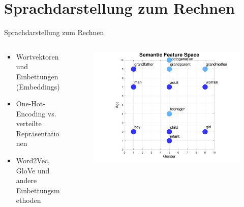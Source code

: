 \documentclass[aspectratio=1610, xcolor=dvipsnames, 9pt]{beamer}
\begin{document}
\section{Sprachdarstellung zum Rechnen}
\begin{frame}{Sprachdarstellung zum Rechnen}
  \begin{columns}
    \begin{column}{0.5\textwidth}
      \begin{itemize}
        \item Wortvektoren und Einbettungen (Embeddings) \\ 
        \item One-Hot-Encoding vs. verteilte Repräsentationen \\ 
        \item Word2Vec, GloVe und andere Einbettungsmethoden
      \end{itemize}
    \end{column}
    \begin{column}{0.5\textwidth}
      \begin{figure}
        \centering
        \includegraphics[width=\textwidth]{images/semantic_vectors.png}
      \end{figure}
    \end{column}
  \end{columns}
\end{frame}
\end{document}
